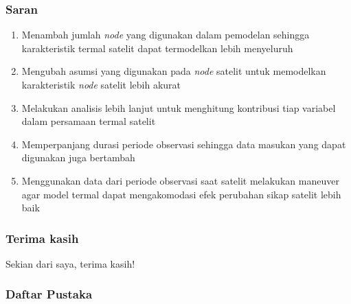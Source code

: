 \documentclass[8pt]{beamer}
\begin{document}
\begin{frame}
  \frametitle{Saran}
\begin{enumerate}
\item Menambah jumlah \textit{node} yang digunakan dalam pemodelan sehingga karakteristik termal satelit dapat termodelkan lebih menyeluruh
\item Mengubah asumsi yang digunakan pada \textit{node} satelit untuk memodelkan karakteristik \textit{node} satelit lebih akurat
\item Melakukan analisis lebih lanjut untuk menghitung kontribusi tiap variabel dalam persamaan termal satelit
\item Memperpanjang durasi periode observasi sehingga data masukan yang dapat digunakan juga bertambah
\item Menggunakan data dari periode observasi saat satelit melakukan maneuver agar model termal dapat mengakomodasi efek perubahan sikap satelit lebih baik
\end{enumerate}
\end{frame}

\begin{frame}
  \frametitle{Terima kasih}
  \large \center Sekian dari saya, terima kasih!
\end{frame}


\begin{frame}
  \frametitle{Daftar Pustaka}
  \tiny
  
\end{frame}
\end{document}
